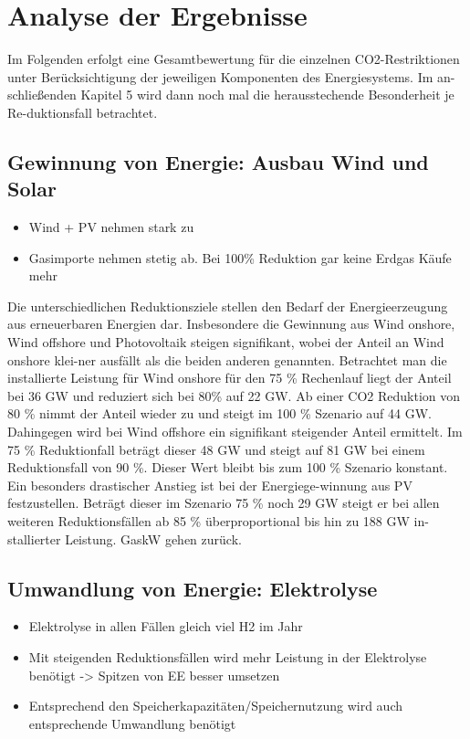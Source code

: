 \section{Analyse der Ergebnisse}
Im Folgenden erfolgt eine Gesamtbewertung für die einzelnen CO2-Restriktionen unter Berücksichtigung der jeweiligen Komponenten des Energiesystems. Im an-schließenden Kapitel 5 wird dann noch mal die herausstechende Besonderheit je Re-duktionsfall betrachtet. 

\subsection{Gewinnung von Energie: Ausbau Wind und Solar}
\begin{itemize}
  \item Wind + PV nehmen stark zu
  \item Gasimporte nehmen stetig ab. Bei 100\% Reduktion gar keine Erdgas Käufe mehr
\end{itemize}
Die unterschiedlichen Reduktionsziele stellen den Bedarf der Energieerzeugung aus erneuerbaren Energien dar. Insbesondere die Gewinnung aus Wind onshore, Wind offshore und Photovoltaik steigen signifikant, wobei der Anteil an Wind onshore klei-ner ausfällt als die beiden anderen genannten. Betrachtet man die installierte Leistung für Wind onshore für den 75 \% Rechenlauf liegt der Anteil bei 36 GW und reduziert sich bei 80\% auf 22 GW. Ab einer CO2 Reduktion von 80 \% nimmt der Anteil wieder zu und steigt im 100 \% Szenario auf 44 GW. Dahingegen wird bei Wind offshore ein signifikant steigender Anteil ermittelt. Im 75 \% Reduktionfall beträgt dieser 48 GW und steigt auf 81 GW bei einem Reduktionsfall von 90 \%. Dieser Wert bleibt bis zum 100 \% Szenario konstant. Ein besonders drastischer Anstieg ist bei der Energiege-winnung aus PV festzustellen. Beträgt dieser im Szenario 75 \% noch 29 GW steigt er bei allen weiteren Reduktionsfällen ab 85 \% überproportional bis hin zu 188 GW in-stallierter Leistung. 
GaskW gehen zurück. 



\subsection{Umwandlung von Energie: Elektrolyse}
\begin{itemize}
  \item Elektrolyse in allen Fällen gleich viel H2 im Jahr
  \item Mit steigenden Reduktionsfällen wird mehr Leistung in der Elektrolyse benötigt -> Spitzen von EE besser umsetzen
  \item Entsprechend den Speicherkapazitäten/Speichernutzung wird auch entsprechende Umwandlung benötigt
\end{itemize}


